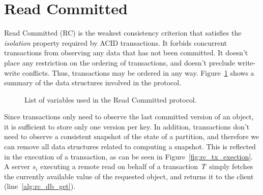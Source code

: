 \clearpage

\section{Read Committed}
\label{appendix:rc}

Read Committed (RC) is the weakest consistency criterion that satisfies the \emph{isolation} property required by ACID transactions. It forbids concurrent transactions from observing any data that has not been committed. It doesn't place any restriction on the ordering of transactions, and doesn't preclude write-write conflicts. Thus, transactions may be ordered in any way. Figure~\ref{fig:rc-prot-ds-table} shows a summary of the data structures involved in the protocol.

\begin{figure}[h]
\noindent{}
\caption{List of variables used in the Read Committed protocol.}
\label{fig:rc-prot-ds-table}
\end{figure}

Since transactions only need to observe the last committed version of an object, it is sufficient to store only one version per key. In addition, transactions don't need to observe a consistent snapshot of the state of a partition, and therefore we can remove all data structures related to computing a snapshot. This is reflected in the execution of a transaction, as can be seen in Figure~\ref{fig:rc_tx_exection}. A server $s_i$ executing a remote read on behalf of a transaction $\mathit{T}$ simply fetches the currently available value of the requested object, and returns it to the client (line~\ref{alg:rc_db_get}).

